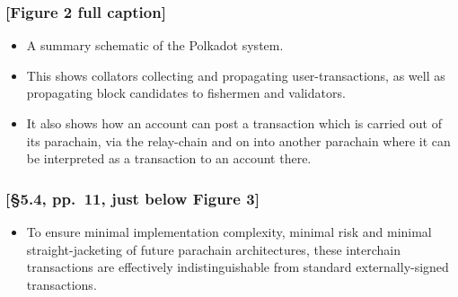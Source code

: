 \documentclass[t,usepdftitle=false]{beamer}
\begin{document}
\begin{frame}
\frametitle{[Figure 2 full caption]}
\begin{itemize}
\item A summary schematic of the Polkadot system.
\item This shows collators collecting and propagating user-transactions, as well as propagating block candidates to fishermen and validators.
\item It also shows how an account can post a transaction which is carried out of its parachain, via the relay-chain and on into another parachain where it can be interpreted as a transaction to an account there.
\end{itemize}
\end{frame}

\begin{frame}
\frametitle{[\S 5.4, pp.\ 11, just below Figure 3]}
\begin{itemize}
\item To ensure minimal implementation complexity, minimal risk and minimal straight-jacketing of future parachain architectures, these interchain transactions are effectively indistinguishable from standard externally-signed transactions. 
\end{itemize}
\end{frame}

\setcounter{figure}{0}
\end{document}
